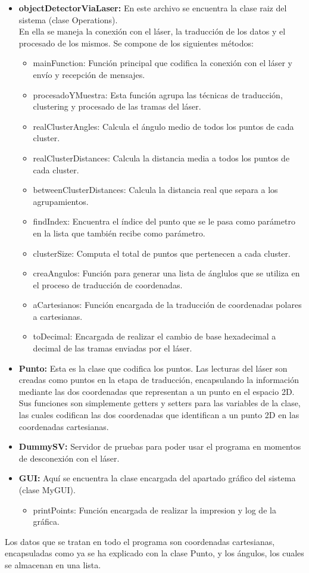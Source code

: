 \begin{itemize}
\item \textbf{objectDetectorViaLaser:} En este archivo se encuentra la clase raiz del sistema (clase Operations).\\ En ella se maneja la conexión con el láser, la traducción de los datos y el procesado de los mismos. Se compone de los siguientes métodos: 
\begin{itemize}
\item mainFunction: Función principal que codifica la conexión con el láser y envío y recepción de mensajes.
\item procesadoYMuestra: Esta función agrupa las técnicas de traducción, clustering y procesado de las tramas del láser.
\item realClusterAngles: Calcula el ángulo medio de todos los puntos de cada cluster.
\item realClusterDistances: Calcula la distancia media a todos los puntos de cada cluster.
\item betweenClusterDistances: Calcula la distancia real que separa a los agrupamientos.
\item findIndex: Encuentra el índice del punto que se le pasa como parámetro en la lista que también recibe como parámetro.
\item clusterSize: Computa el total de puntos que pertenecen a cada cluster.
\item creaAngulos: Función para generar una lista de ánglulos que se utiliza en el proceso de traducción de coordenadas.
\item aCartesianos: Función encargada de la traducción de coordenadas polares a cartesianas.
\item toDecimal: Encargada de realizar el cambio de base hexadecimal a decimal de las tramas enviadas por el láser.
\end{itemize}
\item \textbf{Punto:} Esta es la clase que codifica los puntos. Las lecturas del láser son creadas como puntos en la etapa de traducción, encapsulando la información mediante las dos coordenadas que representan a un punto en el espacio 2D. Sus funciones son simplemente getters y setters para las variables de la clase, las cuales codifican las dos coordenadas que identifican a un punto 2D en las coordenadas cartesianas.

\item \textbf{DummySV:} Servidor de pruebas para poder usar el programa en momentos de desconexión con el láser.
\item \textbf{GUI:} Aquí se encuentra la clase encargada del apartado gráfico del sistema (clase MyGUI). 
\begin{itemize}
\item printPoints: Función encargada de realizar la impresion y log de la gráfica.
\end{itemize}
\end{itemize}
Los datos que se tratan en todo el programa son coordenadas cartesianas, encapsuladas como ya se ha explicado con la clase Punto, y los ángulos, los cuales se almacenan en una lista.

